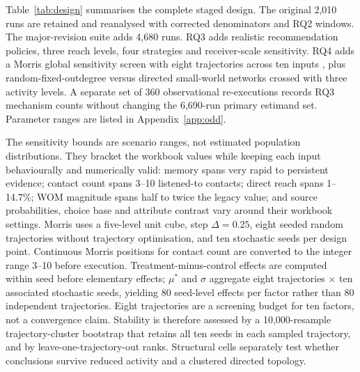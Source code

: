 Table~\ref{tab:design} summarises the complete staged design. The original 2,010 runs are retained and reanalysed with corrected denominators and RQ2 windows. The major-revision suite adds 4,680 runs. RQ3 adds realistic recommendation policies, three reach levels, four strategies and receiver-scale sensitivity. RQ4 adds a Morris global sensitivity screen with eight trajectories across ten inputs \citep{morris1991}, plus random-fixed-outdegree versus directed small-world networks crossed with three activity levels. A separate set of 360 observational re-executions records RQ3 mechanism counts without changing the 6,690-run primary estimand set. Parameter ranges are listed in Appendix~\ref{app:odd}.

The sensitivity bounds are scenario ranges, not estimated population distributions. They bracket the workbook values while keeping each input behaviourally and numerically valid: memory spans very rapid to persistent evidence; contact count spans 3--10 listened-to contacts; direct reach spans 1--14.7\%; WOM magnitude spans half to twice the legacy value; and source probabilities, choice base and attribute contrast vary around their workbook settings. Morris uses a five-level unit cube, step $\Delta=0.25$, eight seeded random trajectories without trajectory optimisation, and ten stochastic seeds per design point. Continuous Morris positions for contact count are converted to the integer range 3--10 before execution. Treatment-minus-control effects are computed within seed before elementary effects; $\mu^*$ and $\sigma$ aggregate eight trajectories $\times$ ten associated stochastic seeds, yielding 80 seed-level effects per factor rather than 80 independent trajectories. Eight trajectories are a screening budget for ten factors, not a convergence claim. Stability is therefore assessed by a 10,000-resample trajectory-cluster bootstrap that retains all ten seeds in each sampled trajectory, and by leave-one-trajectory-out ranks. Structural cells separately test whether conclusions survive reduced activity and a clustered directed topology.

